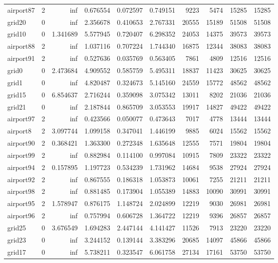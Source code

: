 \begin{longtable}{|l|r|r|r|r|r|r|r|r|r|}
airport87 & 2 & inf & 0.676554 & 0.072597 & 0.749151 & 9223 & 5474 & 15285 & 15285 \\
grid20 & 0 & inf & 2.356678 & 0.410653 & 2.767331 & 20555 & 15189 & 51508 & 51508 \\
grid10 & 0 & 1.341689 & 5.577945 & 0.720407 & 6.298352 & 24053 & 14375 & 39573 & 39573 \\
airport88 & 2 & inf & 1.037116 & 0.707224 & 1.744340 & 16875 & 12344 & 38083 & 38083 \\
airport91 & 2 & inf & 0.527636 & 0.035769 & 0.563405 & 7861 & 4809 & 12516 & 12516 \\
grid0 & 0 & 2.473684 & 4.909552 & 0.585759 & 5.495311 & 18837 & 11423 & 30625 & 30625 \\
grid1 & 0 & inf & 4.820487 & 0.324673 & 5.145160 & 24559 & 15772 & 48562 & 48562 \\
grid15 & 0 & 6.854637 & 2.716244 & 0.359098 & 3.075342 & 13011 & 8202 & 21036 & 21036 \\
grid21 & 0 & inf & 2.187844 & 0.865709 & 3.053553 & 19917 & 14827 & 49422 & 49422 \\
airport97 & 2 & inf & 0.423566 & 0.050077 & 0.473643 & 7017 & 4778 & 13444 & 13444 \\
airport8 & 2 & 3.097744 & 1.099158 & 0.347041 & 1.446199 & 9885 & 6024 & 15562 & 15562 \\
airport90 & 2 & 0.368421 & 1.363300 & 0.272348 & 1.635648 & 12555 & 7571 & 19804 & 19804 \\
airport99 & 2 & inf & 0.882984 & 0.114100 & 0.997084 & 10915 & 7809 & 23322 & 23322 \\
airport94 & 2 & 0.157895 & 1.197723 & 0.534239 & 1.731962 & 14684 & 9538 & 27924 & 27924 \\
airport92 & 2 & inf & 0.867555 & 0.186318 & 1.053873 & 10061 & 7255 & 21211 & 21211 \\
airport98 & 2 & inf & 0.881485 & 0.173904 & 1.055389 & 14883 & 10090 & 30991 & 30991 \\
airport95 & 2 & 1.578947 & 0.876175 & 1.148724 & 2.024899 & 12219 & 9030 & 26981 & 26981 \\
airport96 & 2 & inf & 0.757994 & 0.606728 & 1.364722 & 12219 & 9396 & 26857 & 26857 \\
grid25 & 0 & 3.676549 & 1.694283 & 2.447144 & 4.141427 & 11526 & 7913 & 23220 & 23220 \\
grid23 & 0 & inf & 3.244152 & 0.139144 & 3.383296 & 20685 & 14097 & 45866 & 45866 \\
grid17 & 0 & inf & 5.738211 & 0.323547 & 6.061758 & 27134 & 17161 & 53750 & 53750 \\

\end{longtable}
